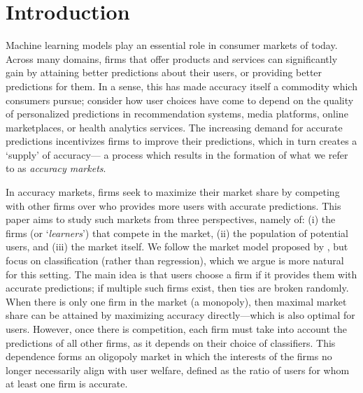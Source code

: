 \section{Introduction}


Machine learning models play an essential role in consumer markets of today.
Across many domains,
firms that offer products and services can significantly gain by attaining better predictions about their users, or providing better predictions for them.
In a sense, this has made accuracy itself a commodity which consumers pursue;
consider how user choices have come to depend on the quality of personalized predictions in
recommendation systems,
media platforms, online marketplaces,
or health analytics services.
The increasing demand for accurate predictions incentivizes firms to improve their predictions, which
in turn creates a `supply' of accuracy---%
a process which results in the formation of what we refer to as \emph{accuracy markets}.




In accuracy markets, firms seek to maximize their market share by 
competing with other firms over who provides more users with accurate predictions.
This paper aims to study such markets from three perspectives,
namely of:
(i) the firms (or `\emph{learners}') that compete in the market,
(ii) the population of potential users,
and (iii) the market itself.
We follow the market model proposed by \citet{ben2017best,ben2019regression},
but focus on classification (rather than regression),
which we argue is more natural for this setting.
The main idea is that users choose a firm if it provides them with accurate predictions;
if multiple such firms exist, then ties are broken randomly.
When there is only one firm in the market (a monopoly),
then maximal market share can be attained by maximizing accuracy directly---which is also optimal for users.
However, once there is competition, each firm must take into account
the predictions of all other firms, as it depends on their choice of classifiers.
This dependence forms an oligopoly market in which the interests of the firms
no longer necessarily align with user welfare,
defined as the ratio of users for whom at least one firm is accurate.

